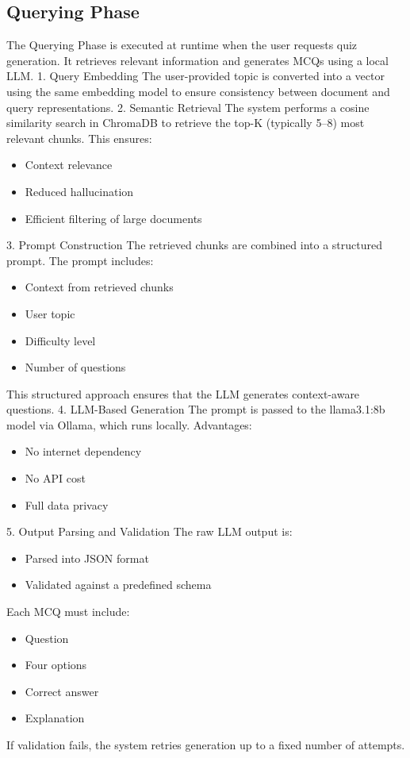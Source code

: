 \documentclass[12pt,a4paper]{report}
\begin{document}
\subsection{Querying Phase}
The Querying Phase is executed at runtime when the user requests quiz generation. It retrieves relevant information and generates MCQs using a local LLM.
1. Query Embedding
The user-provided topic is converted into a vector using the same embedding model to ensure consistency between document and query representations.
2. Semantic Retrieval
The system performs a cosine similarity search in ChromaDB to retrieve the top-K (typically 5–8) most relevant chunks. This ensures:
\begin{itemize}
\item Context relevance
\item Reduced hallucination
\item Efficient filtering of large documents
\end{itemize}
3. Prompt Construction
The retrieved chunks are combined into a structured prompt. The prompt includes:
\begin{itemize}
\item Context from retrieved chunks
\item User topic
\item Difficulty level
\item Number of questions
\end{itemize}
This structured approach ensures that the LLM generates context-aware questions.
4. LLM-Based Generation
The prompt is passed to the llama3.1:8b model via Ollama, which runs locally. Advantages:
\begin{itemize}
\item No internet dependency
\item No API cost
\item Full data privacy
\end{itemize}
5. Output Parsing and Validation
The raw LLM output is:
\begin{itemize}
\item Parsed into JSON format
\item Validated against a predefined schema
\end{itemize}
Each MCQ must include:
\begin{itemize}
\item Question
\item Four options
\item Correct answer
\item Explanation
\end{itemize}
If validation fails, the system retries generation up to a fixed number of attempts.
\end{document}
